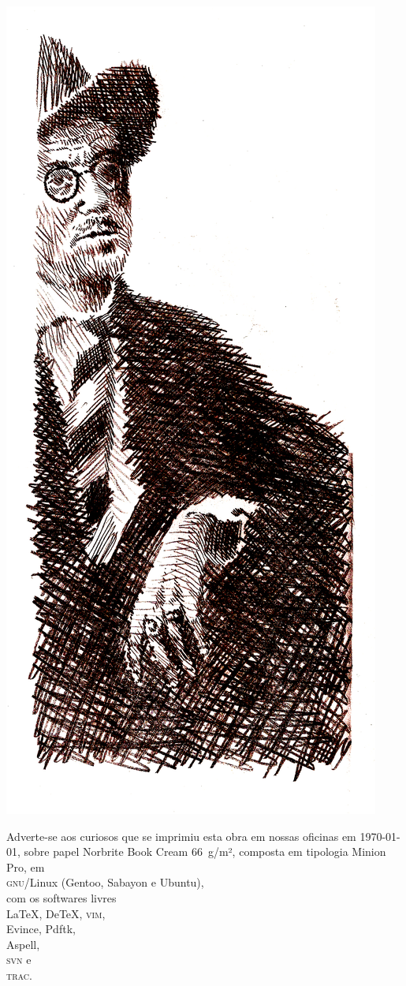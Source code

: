 \pagebreak
\ifodd\thepage\blank\else\relax\fi

\thispagestyle{empty}
\mbox{}\vfill

\begin{center}
\includegraphics[width=.5\textwidth]{joyce2.jpg}
\end{center}

\mbox{}\vfill

\begin{adjustwidth}{.15\textwidth}{.15\textwidth}
{\noindent\centering\footnotesize
Adverte-se aos curiosos que se imprimiu esta obra em nossas oficinas
em \today, sobre papel Norbrite Book Cream 66~g/m²,
composta em tipologia Minion Pro, em\\ \textsc{gnu}/Linux
(Gentoo, Sabayon e Ubuntu),\\ com os softwares livres\\
\LaTeX, De\TeX, \textsc{vim},\\ Evince, Pdftk,\\
Aspell,\\ \textsc{svn} e\\ \textsc{trac}.\par}
\end{adjustwidth}


